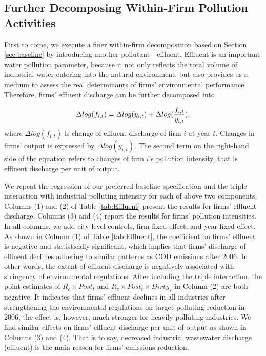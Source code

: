\documentclass[12pt,english]{article}
\begin{document}


\subsection{Further Decomposing Within-Firm Pollution Activities}\label{sec:further decomposition}

First to come, we execute a finer within-firm decomposition based on Section \ref{sec:baseline} by introducing another pollutant---effluent. Effluent is an important water pollution parameter, because it not only reflects the total volume of industrial water entering into the natural environment, but also provides us a medium to assess the real determinants of firms' environmental performance. Therefore, firms' effluent discharge can be further decomposed into

\begin{equation}\label{eq:log(f_{i,t})}
\Delta log(f_{i,t})=\Delta log(y_{i,t})+\Delta log(\dfrac{f_{i,t}}{y_{i,t}}),
\end{equation}
where $\Delta log(f_{i,t})$ is change of effluent discharge of firm $i$ at year $t$. Changes in firms' output is expressed by $\Delta log(y_{i,t})$. The second term on the right-hand side of the equation refers to changes of firm $i$'s pollution intensity, that is effluent discharge per unit of output.

We repeat the regression of our preferred baseline specification and the triple interaction with industrial polluting intensity for each of above two components. Columns (1) and (2) of Table \ref{tab:Effluent} present the results for firms' effluent discharge. Columns (3) and (4) report the results for firms' pollution intensities. In all columns, we add city-level controls, firm fixed effect, and year fixed effect. As shown in Column (1) of Table \ref{tab:Effluent}, the coefficient on firms' effluent is negative and statistically significant, which implies that firms' discharge of effluent declines adhering to similar patterns as COD emissions after 2006. In other words, the extent of effluent discharge is negatively associated with stringency of environmental regulations. After including the triple interaction, the point estimates of $R_{c}\times Post_{t}$ and $R_{c}\times Post_{t}\times Dirty_{s}$ in Column (2) are both negative. It indicates that firms' effluent declines in all industries after strengthening the environmental regulations on target polluting reduction in 2006, the effect is, however, much stronger for heavily polluting industries. We find similar effects on firms' effluent discharge per unit of output as shown in Columns (3) and (4). That is to say, decreased industrial wastewater discharge (effluent) is the main reason for firms' emissions reduction.
\end{document}
